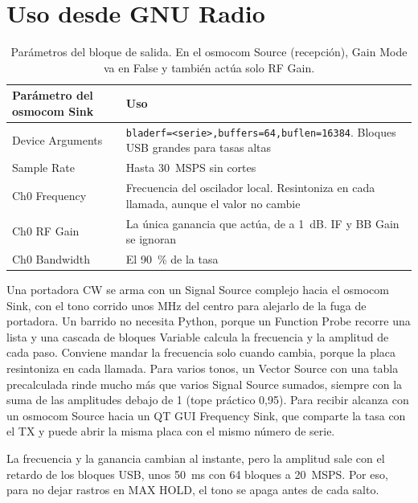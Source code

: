 \documentclass[11pt,a4paper]{article}
\begin{document}
\section{Uso desde GNU Radio}

\begin{table}[H]
  \centering
  \small
  \begin{tabular}{@{}L{4.2cm}L{9.8cm}@{}}
    \toprule
    Parámetro del osmocom Sink & Uso \\
    \midrule
    Device Arguments & \texttt{bladerf=<serie>,buffers=64,buflen=16384}. Bloques USB grandes para tasas altas \\
    Sample Rate & Hasta 30~MSPS sin cortes \\
    Ch0 Frequency & Frecuencia del oscilador local. Resintoniza en cada llamada, aunque el valor no cambie \\
    Ch0 RF Gain & La única ganancia que actúa, de a 1~dB. IF y BB Gain se ignoran \\
    Ch0 Bandwidth & El 90~\% de la tasa \\
    \bottomrule
  \end{tabular}
  \caption{Parámetros del bloque de salida. En el osmocom Source (recepción), Gain Mode va en False y también actúa solo RF Gain.}
\end{table}

Una portadora CW se arma con un Signal Source complejo hacia el osmocom Sink, con el tono corrido unos MHz del centro para alejarlo de la fuga de portadora. Un barrido no necesita Python, porque un Function Probe recorre una lista y una cascada de bloques Variable calcula la frecuencia y la amplitud de cada paso. Conviene mandar la frecuencia solo cuando cambia, porque la placa resintoniza en cada llamada. Para varios tonos, un Vector Source con una tabla precalculada rinde mucho más que varios Signal Source sumados, siempre con la suma de las amplitudes debajo de 1 (tope práctico 0,95). Para recibir alcanza con un osmocom Source hacia un QT GUI Frequency Sink, que comparte la tasa con el TX y puede abrir la misma placa con el mismo número de serie.

La frecuencia y la ganancia cambian al instante, pero la amplitud sale con el retardo de los bloques USB, unos 50~ms con 64 bloques a 20~MSPS. Por eso, para no dejar rastros en MAX HOLD, el tono se apaga antes de cada salto.

\end{document}
